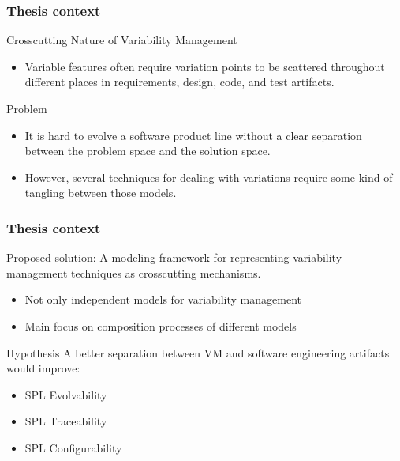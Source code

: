 \documentclass[xcolor=svgnames]{beamer}
\begin{document}
\begin{frame}
\frametitle{Thesis context}

\begin{block}{Crosscutting Nature of Variability Management}
\begin{itemize}
	\item Variable features often require variation points to be scattered
	throughout different places in requirements, design, code, and test artifacts.
\end{itemize}
\end{block}

\begin{block}{Problem}
\begin{itemize}
  \item It is hard to evolve a software product line without a clear separation
  between the problem space and the solution space.
	
  \item	However, several techniques for dealing with variations require 
	some kind of tangling between those models.    
\end{itemize}
\end{block}
\end{frame}

\begin{frame}
\frametitle{Thesis context}

\begin{block}{Proposed solution:}
A modeling framework for representing variability management techniques as
crosscutting mechanisms.
\begin{itemize}
  \item Not only independent models for variability management
  \item Main focus on composition processes of different models
\end{itemize}
\end{block}

\begin{block}{Hypothesis}
A better separation between VM and software engineering
artifacts would improve:

\begin{itemize}
  \item SPL Evolvability
  \item SPL Traceability
  \item SPL Configurability
\end{itemize}
\end{block}

\end{frame}
\end{document}
